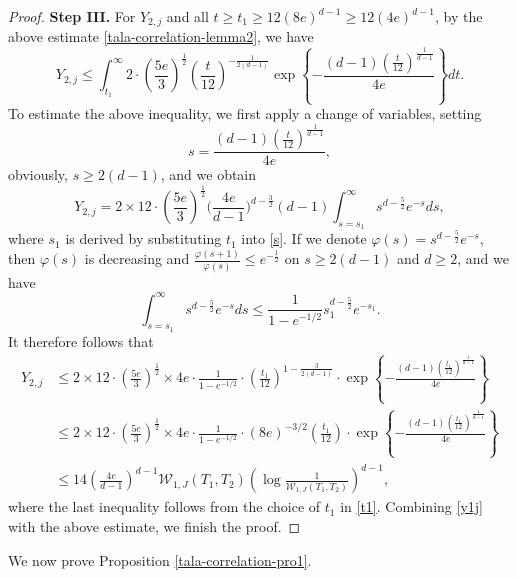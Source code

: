 \documentclass{amsbook}
\theoremstyle{definition}
\theoremstyle{remark}
\numberwithin{section}{chapter}
\numberwithin{equation}{chapter}
\newcommand{\1}{\mathbf{1}}
\begin{document}
\begin{proof}
	\textbf{Step III.} For $Y_{2,j}$ and all $t\geq t_1\geq 12(8e)^{d-1}\geq12(4e)^{d-1}$, by the above estimate \eqref{tala-correlation-lemma2}, we have
$$Y_{2,j}\leq \int_{t_1}^{\infty} 2\cdot \left(\frac{5e}{3}\right)^{\frac{1}{2}}\left(\frac{t}{12}\right)^{-\frac{1}{2(d-1)}}\exp\left\{-\frac{(d-1)\left(\frac{t}{12}\right)^\frac{1}{d-1}}{4e}\right\}dt.$$
To estimate the above inequality, we first apply a change of variables, setting 
\begin{equation}\label{s}
s=\frac{(d-1)\left(\frac{t}{12}\right)^\frac{1}{d-1}}{4e},
\end{equation}
obviously, $s\geq 2(d-1)$, and we obtain
$$Y_{2,j}=2\times 12\cdot \left(\frac{5e}{3}\right)^{\frac{1}{2}}\Big(\frac{4e}{d-1}\Big)^{d-\frac{3}{2}}(d-1)\int_{s=s_1}^{\infty} s^{d-\frac{5}{2}}e^{-s}ds,$$
where $s_1$ is derived by substituting  $t_1$ into \eqref{s}. If we denote $\varphi(s)=s^{d-\frac{5}{2}}e^{-s}$, then $\varphi(s)$ is decreasing and $\frac{\varphi(s+1)}{\varphi(s)}\leq e^{-\frac{1}{2}}$ on $s\geq 2(d-1)$ and $d\geq 2$, and we have
$$\int_{s=s_1}^{\infty} s^{d-\frac{5}{2}}e^{-s}ds\leq \frac{1}{1-e^{-1/2}} s_1^{d-\frac{5}{2}}e^{-s_1}.$$ 
It therefore follows that
\begin{align*}	
Y_{2,j}&\leq 
2\times 12\cdot \left(\frac{5e}{3}\right)^{\frac{1}{2}}\times 4e\cdot\frac{1}{1-e^{-1/2}}\cdot \left(\frac{t_1}{12}\right)^{1-\frac{3}{2(d-1)}}\cdot\exp\left\{-\frac{(d-1)(\frac{t_1}{12})^\frac{1}{d-1}}{4e}\right\}\\
		&\leq 2\times 12\cdot \left(\frac{5e}{3}\right)^{\frac{1}{2}}\times 4e\cdot\frac{1}{1-e^{-1/2}}\cdot (8e)^{-3/2} \left(\frac{t_1}{12}\right)\cdot\exp\left\{-\frac{(d-1)(\frac{t_1}{12})^\frac{1}{d-1}}{4e}\right\}\\
		&\leq 14 \left(\frac{4e}{d-1}\right)^{d-1}\mathcal{W}_{1,J}(T_1,T_2)\left(\log\frac{1}{\mathcal{W}_{1,J}(T_1,T_2)}\right)^{d-1},
\end{align*}
where the last inequality follows from the choice of $t_1$ in \eqref{t1}. Combining \eqref{y1j} with the above estimate, we finish the proof.
\end{proof}


We now prove Proposition \ref{tala-correlation-pro1}.
\end{document}
